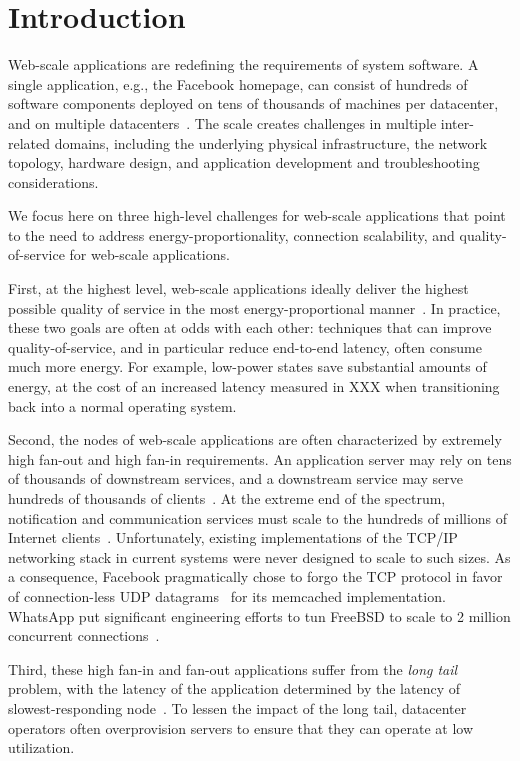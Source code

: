 
\section{Introduction}
\label{sec:intro}

Web-scale applications are redefining the requirements of system
software.  A single application, e.g., the Facebook homepage, can
consist of hundreds of software components deployed on tens of
thousands of machines per datacenter, and on multiple
datacenters~\cite{missing}.  The scale creates challenges in multiple
inter-related domains, including the underlying physical
infrastructure, the network topology, hardware design, and application
development and troubleshooting considerations.  

We focus here on three high-level challenges for web-scale
applications that point to the need to address energy-proportionality,
connection scalability, and quality-of-service for web-scale
applications.

First, at the highest level, web-scale applications ideally deliver
the highest possible quality of service in the most
energy-proportional manner~\cite{DBLP:journals/computer/BarrosoH07}.
In practice, these two goals are often at odds with each other:
techniques that can improve quality-of-service, and in particular
reduce end-to-end latency, often consume much more energy.  For
example, low-power states save substantial amounts of energy, at the
cost of an increased latency measured in XXX when transitioning back
into a normal operating system.

Second, the nodes of web-scale applications are often characterized by
extremely high fan-out and high fan-in requirements.  An application
server may rely on tens of thousands of downstream services, and a
downstream service may serve hundreds of thousands of
clients~\cite{missing}.  At the extreme end of the spectrum,
notification and communication services must scale to the hundreds of
millions of Internet clients~\cite{DBLP:conf/sosp/AdyaCMP11}.
Unfortunately, existing implementations of the TCP/IP networking stack
in current systems were never designed to scale to such sizes.  As a
consequence, Facebook pragmatically chose to forgo the TCP protocol in
favor of connection-less UDP datagrams~\cite{nishtala2013scaling} for
its memcached implementation.  WhatsApp put significant engineering
efforts to tun FreeBSD to scale to 2 million concurrent
connections~\cite{whatsapp-2mil}.

Third, these high fan-in and fan-out applications suffer from the
\emph{long tail} problem, with the latency of the application
determined by the latency of slowest-responding
node~\cite{DBLP:journals/cacm/DeanB13}.  To lessen the impact of the
long tail, datacenter operators often overprovision servers to ensure
that they can operate at low utilization.

